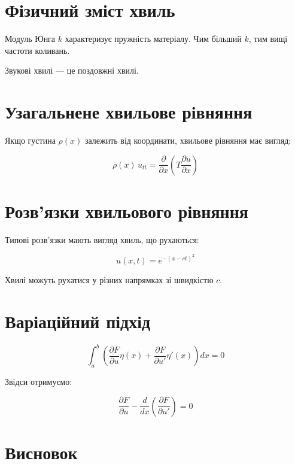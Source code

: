 \documentclass[
  ukrainian,
]{article}
\begin{document}
\section{Фізичний зміст
хвиль}\label{ux444ux456ux437ux438ux447ux43dux438ux439-ux437ux43cux456ux441ux442-ux445ux432ux438ux43bux44c}

Модуль Юнга \(k\) характеризує пружність матеріалу. Чим більший \(k\),
тим вищі частоти коливань.

Звукові хвилі --- це поздовжні хвилі.

\section{Узагальнене хвильове
рівняння}\label{ux443ux437ux430ux433ux430ux43bux44cux43dux435ux43dux435-ux445ux432ux438ux43bux44cux43eux432ux435-ux440ux456ux432ux43dux44fux43dux43dux44f}

Якщо густина \(\rho(x)\) залежить від координати, хвильове рівняння має
вигляд:

\[
\rho(x)\,u_{tt} = \frac{\partial}{\partial x}\left( T \frac{\partial u}{\partial x} \right)
\]

\section{Розв'язки хвильового
рівняння}\label{ux440ux43eux437ux432ux44fux437ux43aux438-ux445ux432ux438ux43bux44cux43eux432ux43eux433ux43e-ux440ux456ux432ux43dux44fux43dux43dux44f}

Типові розв'язки мають вигляд хвиль, що рухаються:

\[
u(x,t) = e^{-(x - ct)^2}
\]

Хвилі можуть рухатися у різних напрямках зі швидкістю \(c\).

\section{Варіаційний
підхід}\label{ux432ux430ux440ux456ux430ux446ux456ux439ux43dux438ux439-ux43fux456ux434ux445ux456ux434}

\[
\int_a^b \left( \frac{\partial F}{\partial u} \eta(x) + \frac{\partial F}{\partial u'} \eta'(x) \right) dx = 0
\]

Звідси отримуємо:

\[
\frac{\partial F}{\partial u} - \frac{d}{dx}\left( \frac{\partial F}{\partial u'} \right) = 0
\]

\section{Висновок}\label{ux432ux438ux441ux43dux43eux432ux43eux43a-1}
\end{document}
